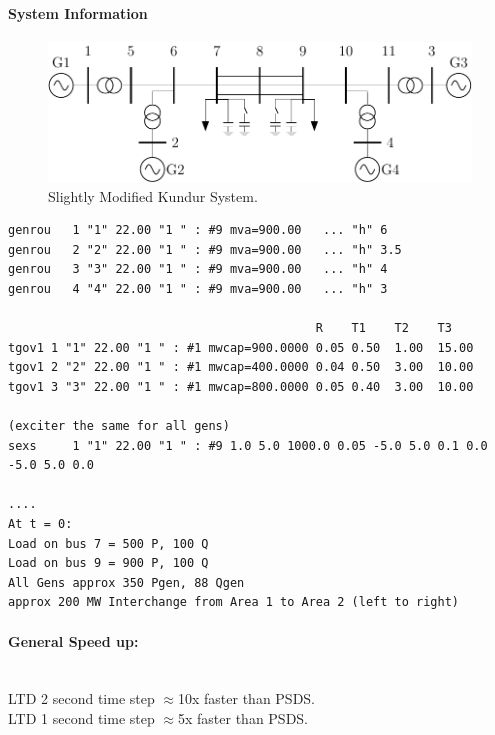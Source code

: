 \documentclass[12pt]{article}
\begin{document}
\paragraph{System Information}
\newcommand{\figW}{1}
	\begin{figure}[h!]
			\centering
			\includegraphics[width=\figW\linewidth]{kundur4LTD.pdf}\vspace{-.5em}
			\caption{Slightly Modified Kundur System.}
			\label{system}		 
	\end{figure}%

\begin{Verbatim}
genrou   1 "1" 22.00 "1 " : #9 mva=900.00   ... "h" 6   
genrou   2 "2" 22.00 "1 " : #9 mva=900.00   ... "h" 3.5 
genrou   3 "3" 22.00 "1 " : #9 mva=900.00   ... "h" 4  
genrou   4 "4" 22.00 "1 " : #9 mva=900.00   ... "h" 3  

                                           R    T1    T2    T3
tgov1 1 "1" 22.00 "1 " : #1 mwcap=900.0000 0.05 0.50  1.00  15.00
tgov1 2 "2" 22.00 "1 " : #1 mwcap=400.0000 0.04 0.50  3.00  10.00
tgov1 3 "3" 22.00 "1 " : #1 mwcap=800.0000 0.05 0.40  3.00  10.00

(exciter the same for all gens)
sexs     1 "1" 22.00 "1 " : #9 1.0 5.0 1000.0 0.05 -5.0 5.0 0.1 0.0 -5.0 5.0 0.0

....
At t = 0:
Load on bus 7 = 500 P, 100 Q
Load on bus 9 = 900 P, 100 Q
All Gens approx 350 Pgen, 88 Qgen
approx 200 MW Interchange from Area 1 to Area 2 (left to right)
\end{Verbatim}

\paragraph{General Speed up:} \ \\
LTD 2 second time step $\approx$10x faster than PSDS.\\
LTD 1 second time step $\approx$5x faster than PSDS.


\pagebreak
\newcommand{\caseName}{kundurStep}
\end{document}
